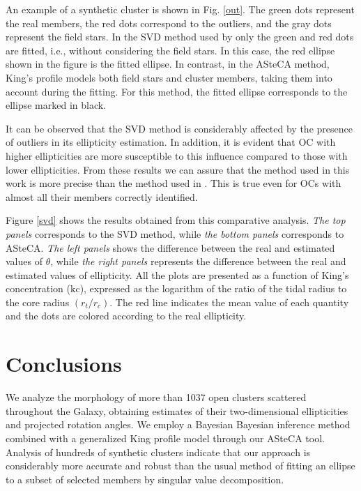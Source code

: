 \documentclass[baaa]{baaa}
\begin{document}
An example of a synthetic cluster is shown in Fig. \ref{out}. The green dots represent the real members, the red dots correspond to the outliers, and the gray dots represent the field stars. In the SVD method used by \cite{2021A&A...656A..49H} only the green and red dots are fitted, i.e., without considering the field stars. 
In this case, the red ellipse shown in the figure is the fitted ellipse.  
In contrast, in the ASteCA method, King's profile models both field stars and cluster members, taking them into account during the fitting. For this method, the fitted ellipse corresponds to the ellipse marked in black.



It can be observed that the SVD method is considerably affected by the presence of outliers in its ellipticity estimation. In addition, it is evident that OC with higher ellipticities are more susceptible to this influence compared to those with lower ellipticities. From these results we can assure that the method used in this work is more precise than the method used in \cite{2021A&A...656A..49H}. This is true even for OCs with almost all their members correctly identified.


Figure \ref{svd} shows the results obtained from this comparative analysis. \emph{The top panels} corresponds to the SVD method, while \emph{the bottom panels} corresponds to ASteCA. \emph{The left panels} shows the difference between the real and estimated values of $\theta$, while \emph{the right panels} represents the difference between the real and estimated values of ellipticity. All the plots are presented as a function of King's concentration ($\mathrm{kc}$), expressed as the logarithm of the ratio of the tidal radius to the core radius $(r_t/r_c)$. The red line indicates the mean value of each quantity and the dots are colored according to the real ellipticity.

\section{Conclusions}
We analyze the morphology of more than 1037 open clusters scattered throughout the Galaxy, obtaining estimates of their two-dimensional ellipticities and projected rotation angles. We employ a Bayesian Bayesian inference method combined with a generalized King profile model through our ASteCA tool. Analysis of hundreds of synthetic clusters indicate that our approach is considerably more accurate and robust than the usual method of fitting an ellipse to a subset of selected members by singular value decomposition.
\end{document}
